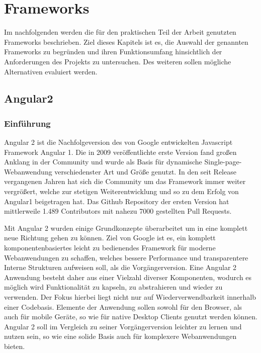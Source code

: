 
\chapter{Frameworks}
\label{chap:frameworks}

Im nachfolgenden werden die für den praktischen Teil der Arbeit genutzten Frameworks beschrieben.
Ziel dieses Kapitels ist es, die Auswahl der genannten Frameworks zu begründen und
ihren Funktionsumfang hinsichtlich der Anforderungen des Projekts zu untersuchen.
Des weiteren sollen mögliche Alternativen evaluiert werden.


\section{Angular2}
\subsection{Einführung}

Angular 2 ist die Nachfolgeversion des von Google entwickelten Javascript Framework Angular 1.
Die in 2009 veröffentlichte erste Version fand großen Anklang in der Community
und wurde als Basis für dynamische Single-page-Webanwendung verschiedenster Art und Größe genutzt.
In den seit Release vergangenen Jahren hat sich die Community um das Framework immer weiter vergrößert,
welche zur stetigen Weiterentwicklung und so zu dem Erfolg von Angular1 beigetragen hat.
Das Github Repository der ersten Version hat mittlerweile 1.489 Contributors mit nahezu 7000 gestellten Pull Requests. \cite{ng1-github}

Mit Angular 2 wurden einige Grundkonzepte überarbeitet um in eine komplett neue Richtung gehen zu können.
Ziel von Google ist es, ein komplett komponentenbasiertes leicht zu bedienendes Framework für moderne
Webanwendungen zu schaffen, welches bessere Performance und transparentere Interne Strukturen aufweisen soll, als die Vorgängerversion.
Eine Angular 2 Anwendung besteht daher aus einer Vielzahl diverser Komponenten, wodurch es möglich wird
Funktionalität zu kapseln, zu abstrahieren und wieder zu verwenden. Der Fokus hierbei liegt nicht nur auf Wiederverwendbarkeit innerhalb einer Codebasis.
Elemente der Anwendung sollen sowohl für den Browser, als auch für mobile Geräte, so wie für native Desktop Clients genutzt werden können.
Angular 2 soll im Vergleich zu seiner Vorgängerversion leichter zu lernen und nutzen sein,
so wie eine solide Basis auch für komplexere Webanwendungen bieten. \cite[11-12]{Angular2}

